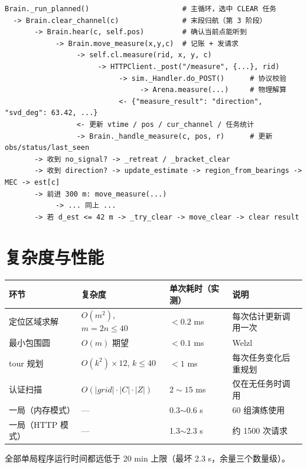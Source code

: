 \begin{lstlisting}[caption={调用链（自顶向下）}]
Brain._run_planned()                      # 主循环，选中 CLEAR 任务
  -> Brain.clear_channel(c)               # 末段归航（第 3 阶段）
       -> Brain.hear(c, self.pos)         # 确认当前点能听到
            -> Brain.move_measure(x,y,c)  # 记账 + 发请求
                 -> self.cl.measure(rid, x, y, c)
                      -> HTTPClient._post("/measure", {...}, rid)
                           -> sim._Handler.do_POST()      # 协议校验
                                -> Arena.measure(...)     # 物理解算
                           <- {"measure_result": "direction", "svd_deg": 63.42, ...}
                 <- 更新 vtime / pos / cur_channel / 任务统计
                 -> Brain._handle_measure(c, pos, r)      # 更新 obs/status/last_seen
       -> 收到 no_signal? -> _retreat / _bracket_clear
       -> 收到 direction? -> update_estimate -> region_from_bearings -> MEC -> est[c]
       -> 前进 300 m: move_measure(...)
            -> ... 同上 ...
       -> 若 d_est <= 42 m -> _try_clear -> move_clear -> clear result
\end{lstlisting}

\section{复杂度与性能}

\begin{center}
\begin{tabular}{p{3.5cm}p{3.5cm}p{2.8cm}p{4.4cm}}
\toprule
环节 & 复杂度 & 单次耗时（实测） & 说明 \\ \midrule
定位区域求解 & $O(m^2)$, $m=2n\le40$ & $<0.2$ ms & 每次估计更新调用一次 \\
最小包围圆 & $O(m)$ 期望 & $<0.1$ ms & Welzl \\
tour 规划 & $O(k^2)\times12$, $k\le40$ & $<1$ ms & 每次任务变化后重规划 \\
认证扫描 & $O(|grid|\cdot|C|\cdot|Z|)$ & $2\sim15$ ms & 仅在无任务时调用 \\
一局（内存模式） & --- & 0.3$\sim$0.6 s & 60 组演练使用 \\
一局（HTTP 模式） & --- & 1.3$\sim$2.3 s & 约 1500 次请求 \\
\bottomrule
\end{tabular}
\end{center}

全部单局程序运行时间都远低于 20 min 上限（最坏 2.3 s，余量三个数量级）。

